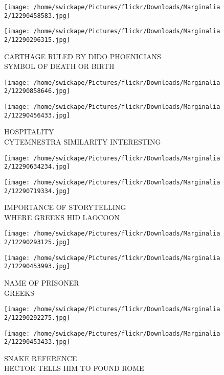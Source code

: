 \documentclass[10pt,letterpaper]{article}
\begin{document}
\texttt{[image: /home/swickape/Pictures/flickr/Downloads/Marginalia 2/12290458583.jpg]}

\vspace{0.25in}
\texttt{[image: /home/swickape/Pictures/flickr/Downloads/Marginalia 2/12290296315.jpg]}

CARTHAGE RULED BY DIDO PHOENICIANS\\
SYMBOL OF DEATH OR BIRTH\\
\pagebreak

\texttt{[image: /home/swickape/Pictures/flickr/Downloads/Marginalia 2/12290858646.jpg]}

\vspace{0.25in}
\texttt{[image: /home/swickape/Pictures/flickr/Downloads/Marginalia 2/12290456433.jpg]}

HOSPITALITY\\
CYTEMNESTRA SIMILARITY INTERESTING\\
\pagebreak

\texttt{[image: /home/swickape/Pictures/flickr/Downloads/Marginalia 2/12290634234.jpg]}

\vspace{0.25in}
\texttt{[image: /home/swickape/Pictures/flickr/Downloads/Marginalia 2/12290719334.jpg]}

IMPORTANCE OF STORYTELLING\\
WHERE GREEKS HID LAOCOON\\
\pagebreak

\texttt{[image: /home/swickape/Pictures/flickr/Downloads/Marginalia 2/12290293125.jpg]}

\vspace{0.25in}
\texttt{[image: /home/swickape/Pictures/flickr/Downloads/Marginalia 2/12290453993.jpg]}

NAME OF PRISONER\\
GREEKS\\
\pagebreak

\texttt{[image: /home/swickape/Pictures/flickr/Downloads/Marginalia 2/12290292275.jpg]}

\vspace{0.25in}
\texttt{[image: /home/swickape/Pictures/flickr/Downloads/Marginalia 2/12290453433.jpg]}

SNAKE REFERENCE\\
HECTOR TELLS HIM TO FOUND ROME\\
\pagebreak
\end{document}
